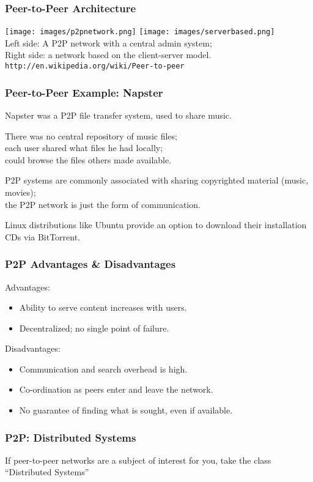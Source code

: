 \begin{frame}
\frametitle{Peer-to-Peer Architecture}

\begin{changemargin}{1cm}
\begin{center}
\texttt{[image: images/p2pnetwork.png]}
\texttt{[image: images/serverbased.png]}\\
Left side: A P2P network with a central admin system;\\
Right side: a network based on the client-server model.\\
\texttt{http://en.wikipedia.org/wiki/Peer-to-peer}
\end{center}


\end{changemargin}
\end{frame}

\begin{frame}
\frametitle{Peer-to-Peer Example: Napster}

\begin{changemargin}{1cm}
Napster was a P2P file transfer system, used to share music. 

There was no central repository of music files;\\
\quad each user shared what files he had locally;\\
\quad could browse the files others made available. 

P2P systems are commonly associated with sharing copyrighted material (music, movies);\\
\quad the P2P network is just the form of communication. 

Linux distributions like Ubuntu provide an option to download their installation CDs via BitTorrent.

\end{changemargin}
\end{frame}


\begin{frame}
\frametitle{P2P Advantages \& Disadvantages}

\begin{changemargin}{1cm}
Advantages:
\begin{itemize}
	\item Ability to serve content increases with users.
	\item Decentralized; no single point of failure.
\end{itemize}

Disadvantages:
\begin{itemize}
	\item Communication and search overhead is high.
	\item Co-ordination as peers enter and leave the network.
	\item No guarantee of finding what is sought, even if available.
\end{itemize}

\end{changemargin}
\end{frame}

\begin{frame}
\frametitle{P2P: Distributed Systems}

\begin{changemargin}{1cm}
If peer-to-peer networks are a subject of interest for you, take the class ``Distributed Systems''
\end{changemargin}
\end{frame}




